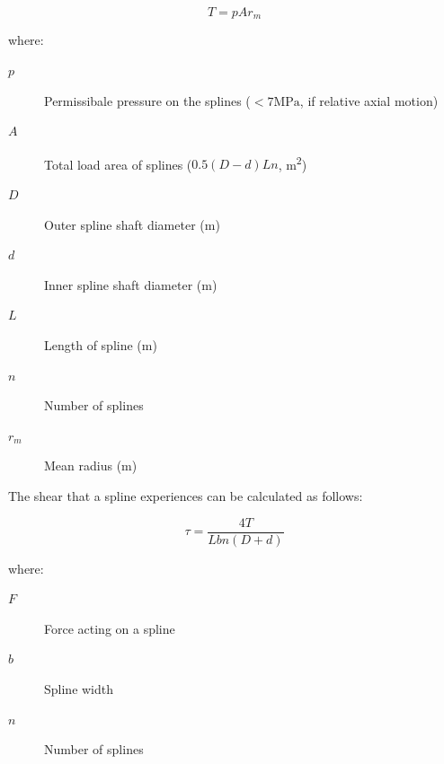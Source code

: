 \begin{equation}
  T=pAr_m
\end{equation}

\noindent where:

\begin{description}
  \item[\( p \)] Permissibale pressure on the splines (\(<7\si{\mega\pascal}\), if relative axial motion)
  \item[\(A\)] Total load area of splines (\(0.5(D-d)Ln\), \si{\metre^2})
  \item[\(D\)] Outer spline shaft diameter (\si{\metre})
  \item[\(d\)] Inner spline shaft diameter (\si{\metre})
  \item[\(L\)] Length of spline (\si{\metre})
  \item[\(n\)] Number of splines
  \item[\(r_m\)] Mean radius (\si{\metre})
\end{description}

The shear that a spline experiences can be calculated as follows:

\begin{equation}
  \tau = \frac{4T}{Lbn(D+d)}
\end{equation}

where:

\begin{description}
  \item[\( F \)] Force acting on a spline 
  \item[\( b \)] Spline width
  \item[\( n \)] Number of splines
\end{description}









